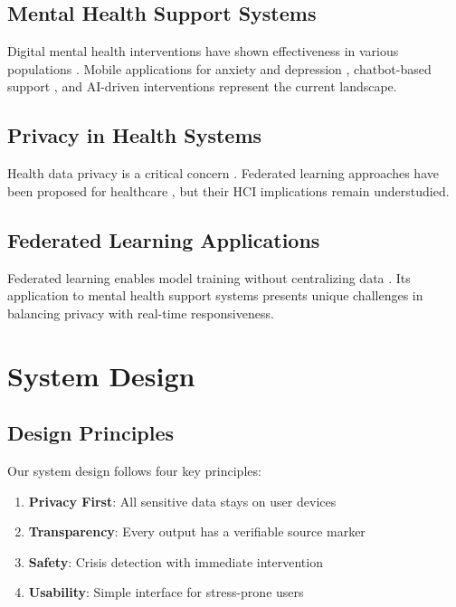 \documentclass[preprint,12pt]{elsarticle}
\begin{document}
\subsection{Mental Health Support Systems}

Digital mental health interventions have shown effectiveness in various
populations \citep{digihealth2018}. Mobile applications for anxiety and depression
\citep{mhapps2021}, chatbot-based support \citep{chatbot2020}, and AI-driven
interventions \citep{aimh2019} represent the current landscape.

\subsection{Privacy in Health Systems}

Health data privacy is a critical concern \citep{privacyhealth2020}. Federated
learning approaches have been proposed for healthcare \citep{fedhealth2019},
but their HCI implications remain understudied.

\subsection{Federated Learning Applications}

Federated learning enables model training without centralizing data \citep{fed2017}.
Its application to mental health support systems presents unique challenges in
balancing privacy with real-time responsiveness.

\section{System Design}

\subsection{Design Principles}

Our system design follows four key principles:

\begin{enumerate}
    \item \textbf{Privacy First}: All sensitive data stays on user devices

    \item \textbf{Transparency}: Every output has a verifiable source marker

    \item \textbf{Safety}: Crisis detection with immediate intervention

    \item \textbf{Usability}: Simple interface for stress-prone users
\end{enumerate}
\end{document}
